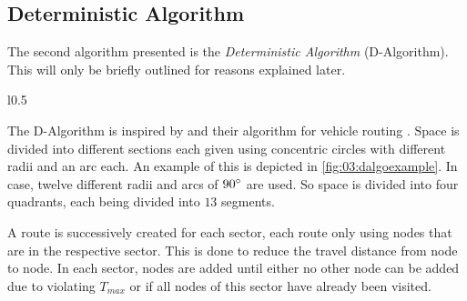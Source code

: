 \subsection{Deterministic Algorithm}
\label{subsec:03:dalgo}

The second algorithm presented is the \emph{Deterministic Algorithm} (D-Algorithm).
This will only be briefly outlined for reasons explained later.

\begin{wrapfigure}{l}{0.5\textwidth}
    \centering
    \caption{An example of the D-Algorithm creating a path restricted to a section.}
    \label{fig:03:dalgoexample}
\end{wrapfigure}

The D-Algorithm is inspired by \citeauthor{wren_computer_1972} and their algorithm for vehicle routing \cite{wren_computer_1972}.
Space is divided into different sections each given using concentric circles with different radii and an arc each.
An example of this is depicted in \cref{fig:03:dalgoexample}.
In \citeauthor{tsiligiridis_heuristic_1984} case, twelve different radii and arcs of $90\degree$ are used.
So space is divided into four quadrants, each being divided into $13$ segments.

A route is successively created for each sector, each route only using nodes that are in the respective sector.
This is done to reduce the travel distance from node to node.
In each sector, nodes are added until either no other node can be added due to violating $T_{max}$ or if all nodes of this sector have already been visited.

